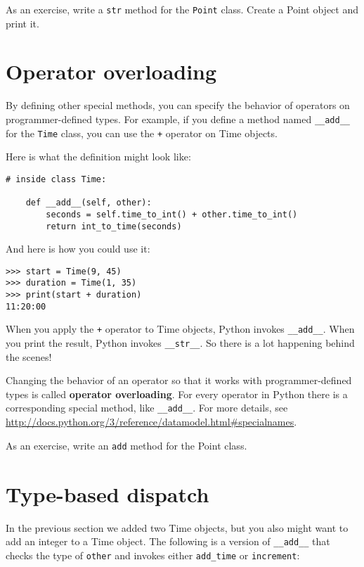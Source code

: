 \documentclass[10pt]{book}
\begin{document}
As an exercise, write a {\tt str} method for the {\tt Point} class.
Create a Point object and print it.


\section{Operator overloading}
\label{operator.overloading}

By defining other special methods, you can specify the behavior
of operators on programmer-defined types.  For example, if you define
a method named \verb"__add__" for the {\tt Time} class, you can use the
{\tt +} operator on Time objects.

Here is what the definition might look like:

\begin{verbatim}
# inside class Time:

    def __add__(self, other):
        seconds = self.time_to_int() + other.time_to_int()
        return int_to_time(seconds)
\end{verbatim}
%
And here is how you could use it:

\begin{verbatim}
>>> start = Time(9, 45)
>>> duration = Time(1, 35)
>>> print(start + duration)
11:20:00
\end{verbatim}
%
When you apply the {\tt +} operator to Time objects, Python invokes
\verb"__add__".  When you print the result, Python invokes 
\verb"__str__".  So there is a lot happening behind the scenes!

Changing the behavior of an operator so that it works with
programmer-defined types is called {\bf operator overloading}.  For every
operator in Python there is a corresponding special method, like 
\verb"__add__".  For more details, see
\url{http://docs.python.org/3/reference/datamodel.html#specialnames}.

As an exercise, write an {\tt add} method for the Point class.  


\section{Type-based dispatch}

In the previous section we added two Time objects, but you
also might want to add an integer to a Time object.  The
following is a version of \verb"__add__"
that checks the type of {\tt other} and invokes either
\verb"add_time" or {\tt increment}:
\end{document}
